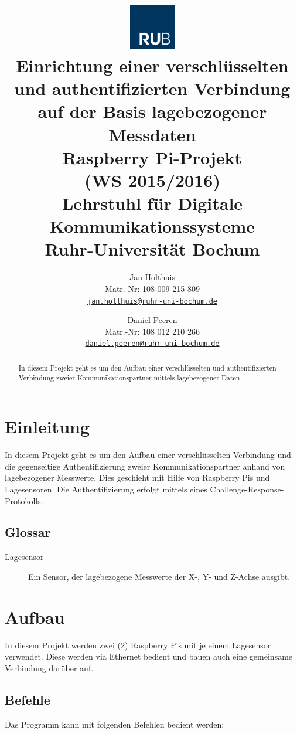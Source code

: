 \documentclass{article}
\title{
\includegraphics[height=2cm]{images/logo_rub}\\\vspace{1cm}
Einrichtung einer verschlüsselten und authentifizierten Verbindung auf der Basis lagebezogener Messdaten\\\vspace{7mm}
Raspberry Pi-Projekt\\(WS 2015/2016)\\\vspace{1cm}
\large{Lehrstuhl für Digitale Kommunikationssysteme\\
Ruhr-Universität Bochum
\\\vspace{0.75cm}}}
\author{
Jan Holthuis\\
Matr.-Nr: 108 009 215 809\\
{\tt \href{mailto:jan.holthuis@ruhr-uni-bochum.de}{jan.holthuis@ruhr-uni-bochum.de}}
\and 
Daniel Peeren\\
Matr.-Nr: 108 012 210 266\\
{\tt \href{mailto:daniel.peeren@ruhr-uni-bochum.de}{daniel.peeren@ruhr-uni-bochum.de}}
\vspace{0.75cm}}
\begin{document}
\maketitle
\thispagestyle{empty}

\begin{abstract}
\noindent
In diesem Projekt geht es um den Aufbau einer verschlüsselten und authentifizierten Verbindung zweier Kommunikationspartner mittels lagebezogener Daten.
\end{abstract}

\newpage
\thispagestyle{empty}
\tableofcontents

\newpage
\setlength{\parindent}{0pt}
\setcounter{page}{1}
\section{Einleitung}
In diesem Projekt geht es um den Aufbau einer verschlüsselten Verbindung und die gegenseitige Authentifizierung zweier Kommunikationspartner anhand von lagebezogener Messwerte. Dies geschieht mit Hilfe von Raspberry Pis und Lagesensoren. Die Authentifizierung erfolgt mittels eines Challenge-Response-Protokolls.\\ %

\subsection{Glossar}
\begin{description}
	\item[Lagesensor] Ein Sensor, der lagebezogene Messwerte der X-, Y- und Z-Achse ausgibt.
\end{description}

\newpage
\section{Aufbau}
In diesem Projekt werden zwei (2) Raspberry Pis mit je einem Lagesensor verwendet. Diese werden via Ethernet bedient und bauen auch eine gemeinsame Verbindung darüber auf.\\

\subsection{Befehle}
Das Programm kann mit folgenden Befehlen bedient werden:\\
\end{document}
